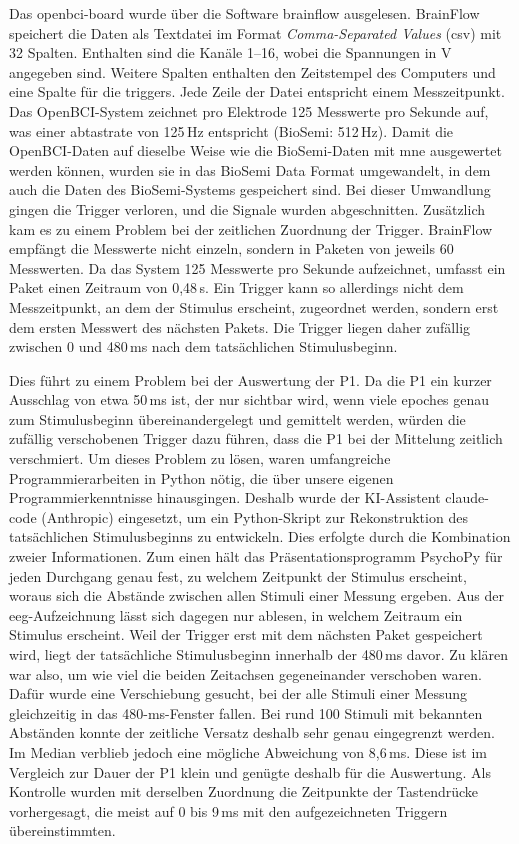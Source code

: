 Das \gls{openbci-board} wurde über die Software \gls{brainflow} ausgelesen.
BrainFlow speichert die Daten als Textdatei im Format \textit{\gls{Comma-Separated Values}} (\acrshort{csv}) mit 32
Spalten. Enthalten sind die Kanäle 1--16, wobei die Spannungen in \textmu V angegeben
sind. Weitere Spalten enthalten den Zeitstempel des Computers und eine Spalte
für die \glspl{trigger}. Jede Zeile der Datei entspricht einem Messzeitpunkt.
Das OpenBCI-System zeichnet pro Elektrode 125 Messwerte pro Sekunde auf, was
einer \gls{abtastrate} von 125\,Hz entspricht (BioSemi: 512\,Hz). Damit die
OpenBCI-Daten auf dieselbe Weise wie die BioSemi-Daten mit \gls{mne}
ausgewertet werden können, wurden sie in das BioSemi Data Format
umgewandelt, in dem auch die Daten des BioSemi-Systems gespeichert sind. Bei
dieser Umwandlung gingen die Trigger verloren, und die Signale wurden
abgeschnitten. Zusätzlich kam es zu einem Problem bei der zeitlichen
Zuordnung der Trigger. BrainFlow empfängt die Messwerte nicht
einzeln, sondern in Paketen von jeweils 60 Messwerten. Da das System 125
Messwerte pro Sekunde aufzeichnet, umfasst ein Paket einen Zeitraum von
0,48\,s. Ein Trigger kann so allerdings nicht dem Messzeitpunkt, an dem
der Stimulus erscheint, zugeordnet werden, sondern erst dem ersten
Messwert des nächsten Pakets. Die Trigger liegen daher zufällig
zwischen 0 und 480\,ms nach dem tatsächlichen Stimulusbeginn.

Dies führt zu einem Problem bei der Auswertung der P1. Da die P1 ein kurzer
Ausschlag von etwa 50\,ms ist, der nur sichtbar wird, wenn viele \glspl{epoche} genau
zum Stimulusbeginn übereinandergelegt und gemittelt werden, würden die zufällig
verschobenen Trigger dazu führen, dass die P1 bei der Mittelung
zeitlich verschmiert. Um dieses Problem zu lösen, waren umfangreiche
Programmierarbeiten in Python nötig, die über unsere eigenen
Programmierkenntnisse hinausgingen. Deshalb wurde der KI-Assistent
\gls{claude-code} (Anthropic) eingesetzt, um ein Python-Skript zur
Rekonstruktion des tatsächlichen Stimulusbeginns zu entwickeln. Dies erfolgte
durch die Kombination zweier Informationen. Zum einen hält das
Präsentationsprogramm PsychoPy für jeden Durchgang genau fest, zu welchem
Zeitpunkt der Stimulus erscheint, woraus sich die Abstände zwischen allen
Stimuli einer Messung ergeben. Aus der \acrshort{eeg}-Aufzeichnung lässt sich dagegen nur
ablesen, in welchem Zeitraum ein Stimulus erscheint. Weil der
Trigger erst mit dem nächsten Paket gespeichert wird, liegt der
tatsächliche Stimulusbeginn innerhalb der 480\,ms davor. Zu klären war also,
um wie viel die beiden Zeitachsen gegeneinander verschoben waren. Dafür wurde
eine Verschiebung gesucht, bei der alle Stimuli einer Messung gleichzeitig in
das 480-ms-Fenster fallen. Bei rund 100 Stimuli mit bekannten Abständen konnte
der zeitliche Versatz deshalb sehr genau eingegrenzt werden. Im Median
verblieb jedoch eine mögliche Abweichung von 8,6\,ms. Diese ist im Vergleich
zur Dauer der P1 klein und genügte deshalb für die Auswertung. Als Kontrolle
wurden mit derselben Zuordnung die Zeitpunkte der Tastendrücke vorhergesagt,
die meist auf 0 bis 9\,ms mit den aufgezeichneten Triggern
übereinstimmten.

